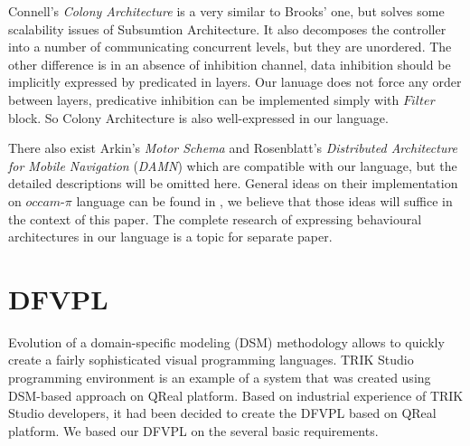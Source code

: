 \documentclass[conference,compsoc]{IEEEtran}
\begin{document}
Connell's \textit{Colony Architecture}\cite{connell1989colony} is a very similar to Brooks' one, but solves some scalability issues of Subsumtion Architecture. It also decomposes the controller into a number of communicating concurrent levels, but they are unordered. The other difference is in an absence of inhibition channel, data inhibition should be implicitly expressed by predicated in layers. Our lanuage does not force any order between layers, predicative inhibition can be implemented simply with $Filter$ block. So Colony Architecture is also well-expressed in our language.

There also exist Arkin’s \textit{Motor Schema}\cite{arkin1987motor} and Rosenblatt’s \textit{Distributed Architecture for Mobile Navigation} (\textit{DAMN})\cite{rosenblatt1997damn} which are compatible with our language, but the detailed descriptions will be omitted here. General ideas on their implementation on $occam\mbox{-}\pi$ language can be found in \cite{simpson2009toward}, we believe that those ideas will suffice in the context of this paper. The complete research of expressing behavioural architectures in our language is a topic for separate paper.


\section{DFVPL}
\label{sec:lang}
Evolution of a domain-specific modeling (DSM) methodology allows to quickly create a fairly sophisticated visual programming languages\cite{DSM}. TRIK Studio programming environment is an example of a system that was created using DSM-based approach on QReal platform\cite{qrealMeta, kuzenkova2013qreal}. Based on industrial experience of TRIK Studio developers, it had been decided to create the DFVPL based on QReal platform. We based our DFVPL on the several basic requirements.
\end{document}
